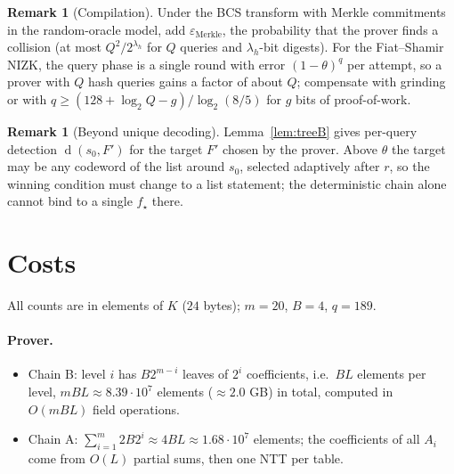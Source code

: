\documentclass[11pt]{article}
\theoremstyle{definition}
\newtheorem{remark}[theorem]{Remark}
\newcommand{\K}{K}
\DeclareMathOperator{\dist}{d}
\begin{document}
\begin{remark}[Compilation]
Under the BCS transform with Merkle commitments in the random-oracle model, add $\varepsilon_{\mathrm{Merkle}}$, the probability that the prover finds a collision (at most $Q^2/2^{\lambda_h}$ for $Q$ queries and $\lambda_h$-bit digests). For the Fiat--Shamir NIZK, the query phase is a single round with error $(1-\theta)^q$ per attempt, so a prover with $Q$ hash queries gains a factor of about $Q$; compensate with grinding or with $q\ge(128+\log_2Q-g)/\log_2(8/5)$ for $g$ bits of proof-of-work.
\end{remark}

\begin{remark}[Beyond unique decoding]
Lemma~\ref{lem:treeB} gives per-query detection $\dist(s_0,F')$ for the target $F'$ chosen by the prover. Above $\theta$ the target may be any codeword of the list around $s_0$, selected adaptively after $r$, so the winning condition must change to a list statement; the deterministic chain alone cannot bind to a single $f_\star$ there.
\end{remark}

\section{Costs}\label{sec:cost}

All counts are in elements of $\K$ ($24$ bytes); $m=20$, $B=4$, $q=189$.

\paragraph{Prover.}
\begin{itemize}[leftmargin=*]
\item Chain B: level $i$ has $B2^{m-i}$ leaves of $2^i$ coefficients, i.e.\ $BL$ elements per level, $mBL\approx8.39\cdot10^7$ elements ($\approx2.0$ GB) in total, computed in $O(mBL)$ field operations.
\item Chain A: $\sum_{i=1}^m2B2^i\approx4BL\approx1.68\cdot10^7$ elements; the coefficients of all $A_i$ come from $O(L)$ partial sums, then one NTT per table.
\end{itemize}
\end{document}
